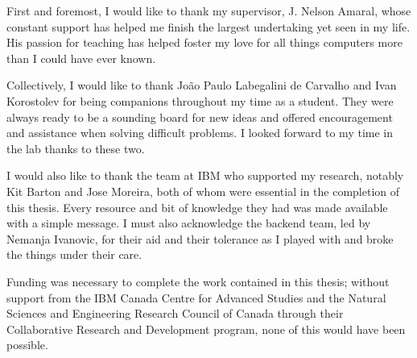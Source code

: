 \documentclass[\main/thesis.tex]{subfiles}
\begin{document}
\begin{acknowledgements}
  First and foremost, I would like to thank my supervisor, J. Nelson Amaral, whose constant support has helped me finish the largest undertaking yet seen in my life.
  His passion for teaching has helped foster my love for all things computers more than I could have ever known.

  Collectively, I would like to thank Jo\~ao Paulo Labegalini de Carvalho and Ivan Korostolev for being companions throughout my time as a student.
  They were always ready to be a sounding board for new ideas and offered encouragement and assistance when solving difficult problems.
  I looked forward to my time in the lab thanks to these two.

  I would also like to thank the team at IBM who supported my research, notably Kit Barton and Jose Moreira, both of whom were essential in the completion of this thesis.
  Every resource and bit of knowledge they had was made available with a simple message.
  I must also acknowledge the backend team, led by Nemanja Ivanovic, for their aid and their tolerance as I played with and broke the things under their care.

  Funding was necessary to complete the work contained in this thesis; without support from the IBM Canada Centre for Advanced Studies and the Natural Sciences and Engineering Research Council of Canada through their Collaborative Research and Development program, none of this would have been possible.
\end{acknowledgements}
\end{document}
